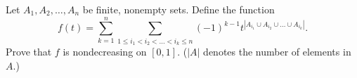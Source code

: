 Let \(A_1,A_2,\dots, A_n\) be finite, nonempty sets. Define the function
\[f(t)=\sum_{k=1}^n \sum_{1\leq i_1<i_2<\dots<i_k\leq n} (-1)^{k-1}t^{|A_{i_1}\cup A_{i_2}\cup \dots\cup A_{i_k}|}.\]
Prove that \(f\) is nondecreasing on \([0,1].\)
(\(|A|\) denotes the number of elements in \(A.\))